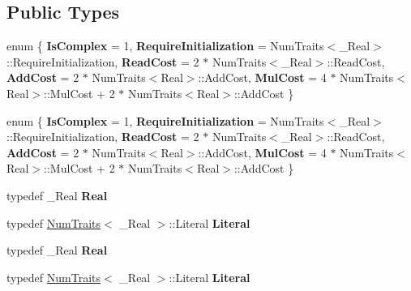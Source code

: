 \subsection*{Public Types}
\begin{DoxyCompactItemize}
\item 
\mbox{\label{struct_eigen_1_1_num_traits_3_01std_1_1complex_3_01___real_01_4_01_4_a1d5b0893ca0e094761d13d44876155aa}} 
enum \{ \newline
{\bfseries Is\+Complex} = 1, 
{\bfseries Require\+Initialization} = Num\+Traits$<$\+\_\+\+Real$>$\+:\+:Require\+Initialization, 
{\bfseries Read\+Cost} = 2 $\ast$ Num\+Traits$<$\+\_\+\+Real$>$\+:\+:Read\+Cost, 
{\bfseries Add\+Cost} = 2 $\ast$ Num\+Traits$<$Real$>$\+:\+:Add\+Cost, 
\newline
{\bfseries Mul\+Cost} = 4 $\ast$ Num\+Traits$<$Real$>$\+:\+:Mul\+Cost + 2 $\ast$ Num\+Traits$<$Real$>$\+:\+:Add\+Cost
 \}
\item 
\mbox{\label{struct_eigen_1_1_num_traits_3_01std_1_1complex_3_01___real_01_4_01_4_a68a6951d1c5fba83b111235724467f46}} 
enum \{ \newline
{\bfseries Is\+Complex} = 1, 
{\bfseries Require\+Initialization} = Num\+Traits$<$\+\_\+\+Real$>$\+:\+:Require\+Initialization, 
{\bfseries Read\+Cost} = 2 $\ast$ Num\+Traits$<$\+\_\+\+Real$>$\+:\+:Read\+Cost, 
{\bfseries Add\+Cost} = 2 $\ast$ Num\+Traits$<$Real$>$\+:\+:Add\+Cost, 
\newline
{\bfseries Mul\+Cost} = 4 $\ast$ Num\+Traits$<$Real$>$\+:\+:Mul\+Cost + 2 $\ast$ Num\+Traits$<$Real$>$\+:\+:Add\+Cost
 \}
\item 
\mbox{\label{struct_eigen_1_1_num_traits_3_01std_1_1complex_3_01___real_01_4_01_4_af538b9f47fde6290124e8568c021d3b6}} 
typedef \+\_\+\+Real {\bfseries Real}
\item 
\mbox{\label{struct_eigen_1_1_num_traits_3_01std_1_1complex_3_01___real_01_4_01_4_aa017fbbc8a02142f677c28fac53af290}} 
typedef \hyperlink{group___core___module_struct_eigen_1_1_num_traits}{Num\+Traits}$<$ \+\_\+\+Real $>$\+::Literal {\bfseries Literal}
\item 
\mbox{\label{struct_eigen_1_1_num_traits_3_01std_1_1complex_3_01___real_01_4_01_4_af538b9f47fde6290124e8568c021d3b6}} 
typedef \+\_\+\+Real {\bfseries Real}
\item 
\mbox{\label{struct_eigen_1_1_num_traits_3_01std_1_1complex_3_01___real_01_4_01_4_aa017fbbc8a02142f677c28fac53af290}} 
typedef \hyperlink{group___core___module_struct_eigen_1_1_num_traits}{Num\+Traits}$<$ \+\_\+\+Real $>$\+::Literal {\bfseries Literal}
\end{DoxyCompactItemize}
